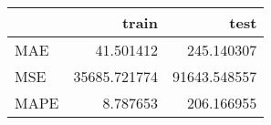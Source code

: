 \begin{tabular}{lrr}
\toprule
{} &         train &          test \\
\midrule
MAE  &     41.501412 &    245.140307 \\
MSE  &  35685.721774 &  91643.548557 \\
MAPE &      8.787653 &    206.166955 \\
\bottomrule
\end{tabular}
